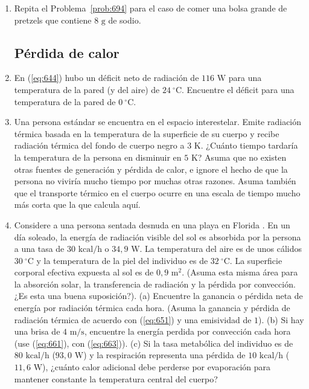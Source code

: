 \documentclass[12pt]{book}
\begin{document}
\begin{enumerate}
\item[6.95] Repita el Problema~\ref{prob:694} para el caso de comer una bolsa grande de pretzels que contiene $8\text{ g}$ de sodio.

\subsection*{Pérdida de calor}

\item[6.96] \label{prob:696} En (\ref{eq:644}) hubo un déficit neto de radiación de $116\text{ W}$ para una temperatura de la pared (y del aire) de $24\ ^\circ\text{C}$. Encuentre el déficit para una temperatura de la pared de $0\ ^\circ\text{C}$.

\item[6.97] Una persona estándar se encuentra en el espacio interestelar. Emite radiación térmica basada en la temperatura de la superficie de su cuerpo y recibe radiación térmica del fondo de cuerpo negro a $3\text{ K}$. ¿Cuánto tiempo tardaría la temperatura de la persona en disminuir en $5\text{ K}$? Asuma que no existen otras fuentes de generación y pérdida de calor, e ignore el hecho de que la persona no viviría mucho tiempo por muchas otras razones. Asuma también que el transporte térmico en el cuerpo ocurre en una escala de tiempo mucho más corta que la que calcula aquí.

\item[6.98] Considere a una persona sentada desnuda en una playa en Florida \cite{19}. En un día soleado, la energía de radiación visible del sol es absorbida por la persona a una tasa de $30\text{ kcal/h}$ o $34{,}9\text{ W}$. La temperatura del aire es de unos cálidos $30\ ^\circ\text{C}$ y la temperatura de la piel del individuo es de $32\ ^\circ\text{C}$. La superficie corporal efectiva expuesta al sol es de $0{,}9\text{ m}^2$. (Asuma esta misma área para la absorción solar, la transferencia de radiación y la pérdida por convección. ¿Es esta una buena suposición?). (a) Encuentre la ganancia o pérdida neta de energía por radiación térmica cada hora. (Asuma la ganancia y pérdida de radiación térmica de acuerdo con (\ref{eq:651}) y una emisividad de $1$). (b) Si hay una brisa de $4\text{ m/s}$, encuentre la energía perdida por convección cada hora (use (\ref{eq:661}), con (\ref{eq:663})). (c) Si la tasa metabólica del individuo es de $80\text{ kcal/h}$ ($93{,}0\text{ W}$) y la respiración representa una pérdida de $10\text{ kcal/h}$ ($11{,}6\text{ W}$), ¿cuánto calor adicional debe perderse por evaporación para mantener constante la temperatura central del cuerpo?


\end{enumerate}
\end{document}
